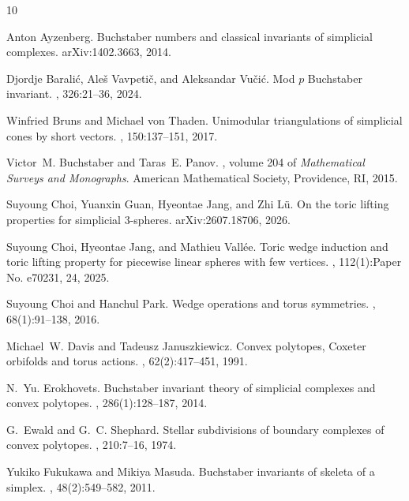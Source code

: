 \documentclass{amsart}
\theoremstyle{plain}
\numberwithin{equation}{section}
\theoremstyle{remark}
\theoremstyle{definition}
\begin{document}
\begin{thebibliography}{10}

Anton Ayzenberg.
\newblock Buchstaber numbers and classical invariants of simplicial complexes.
\newblock arXiv:1402.3663, 2014.

Djordje Barali\'c, Ale\v{s} Vavpeti\v{c}, and Aleksandar Vu\v{c}i\'c.
\newblock Mod {$p$} Buchstaber invariant.
, 326:21--36, 2024.

Winfried Bruns and Michael von Thaden.
\newblock Unimodular triangulations of simplicial cones by short vectors.
, 150:137--151, 2017.

Victor~M. Buchstaber and Taras~E. Panov.
, volume 204 of {\em Mathematical Surveys and Monographs}.
\newblock American Mathematical Society, Providence, RI, 2015.

Suyoung Choi, Yuanxin Guan, Hyeontae Jang, and Zhi L{\"u}.
\newblock On the toric lifting properties for simplicial {$3$}-spheres.
\newblock arXiv:2607.18706, 2026.

Suyoung Choi, Hyeontae Jang, and Mathieu Vall\'ee.
\newblock Toric wedge induction and toric lifting property for piecewise linear spheres with few vertices.
, 112(1):Paper No. e70231, 24, 2025.

Suyoung Choi and Hanchul Park.
\newblock Wedge operations and torus symmetries.
, 68(1):91--138, 2016.

Michael~W. Davis and Tadeusz Januszkiewicz.
\newblock Convex polytopes, {C}oxeter orbifolds and torus actions.
, 62(2):417--451, 1991.

N.~Yu. Erokhovets.
\newblock Buchstaber invariant theory of simplicial complexes and convex polytopes.
, 286(1):128--187, 2014.

G.~Ewald and G.~C. Shephard.
\newblock Stellar subdivisions of boundary complexes of convex polytopes.
, 210:7--16, 1974.

Yukiko Fukukawa and Mikiya Masuda.
\newblock Buchstaber invariants of skeleta of a simplex.
, 48(2):549--582, 2011.


\end{thebibliography}
\end{document}
